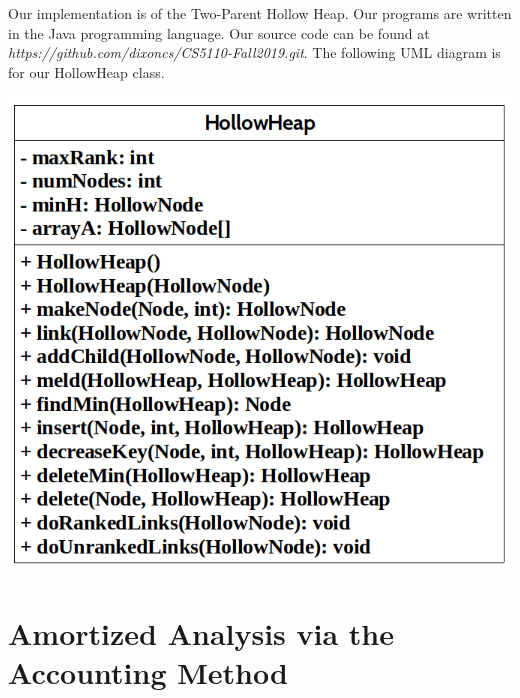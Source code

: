 \documentclass[letter,10pt]{article}
\begin{document}
\quad Our implementation is of the Two-Parent Hollow Heap. Our programs are written in the Java programming language. Our source code can be found at \textit {https://github.com/dixoncs/CS5110-Fall2019.git}. The following UML diagram is for our HollowHeap class. 
\begin{center}
	\includegraphics[scale=0.35]{hollowuml.png}\\
\end{center}

\medskip

\section{Amortized Analysis via the Accounting Method}
\end{document}
